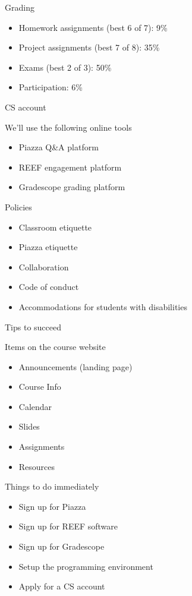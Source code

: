 \documentclass[8pt,a4paper,compress]{beamer}
\begin{document}
\begin{frame}[fragile]
\pause

Grading
\begin{itemize}
\item Homework assignments (best 6 of 7): 9\%
\item Project assignments (best 7 of 8): 35\%
\item Exams (best 2 of 3): 50\%
\item Participation: 6\%
\end{itemize}

\pause
\bigskip

CS account

\pause
\bigskip

We'll use the following online tools
\begin{itemize}
\item Piazza Q\&A platform
\item REEF engagement platform
\item Gradescope grading platform
\end{itemize}

\pause
\bigskip

Policies
\begin{itemize}
\item Classroom etiquette
\item Piazza etiquette
\item Collaboration
\item Code of conduct
\item Accommodations for students with disabilities
\end{itemize}

\pause
\bigskip

Tips to succeed
\end{frame}

\begin{frame}[fragile]
\pause

Items on the course website
\begin{itemize}
\item Announcements (landing page)
\item Course Info
\item Calendar
\item Slides 
\item Assignments
\item Resources
\end{itemize}

\pause
\bigskip

Things to do immediately
\begin{itemize}
\item Sign up for Piazza
\item Sign up for REEF software
\item Sign up for Gradescope
\item Setup the programming environment
\item Apply for a CS account
\end{itemize}
\end{frame}
\end{document}
